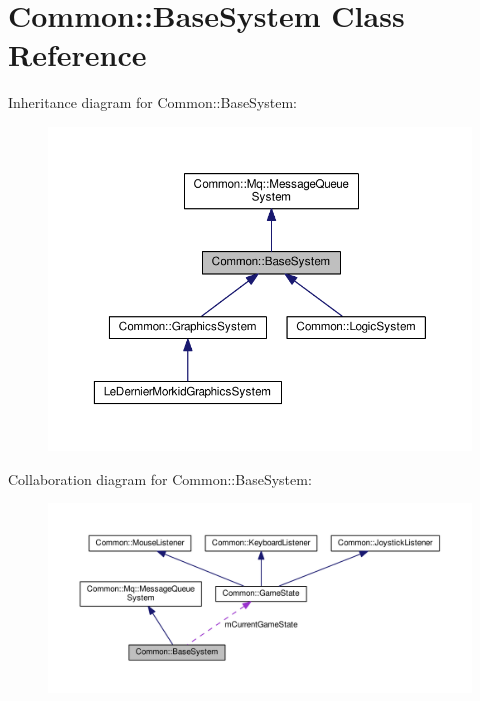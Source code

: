 \hypertarget{class_common_1_1_base_system}{}\section{Common\+:\+:Base\+System Class Reference}
\label{class_common_1_1_base_system}


Inheritance diagram for Common\+:\+:Base\+System\+:\nopagebreak
\begin{figure}[H]
\begin{center}
\leavevmode
\includegraphics[width=350pt]{class_common_1_1_base_system__inherit__graph}
\end{center}
\end{figure}


Collaboration diagram for Common\+:\+:Base\+System\+:\nopagebreak
\begin{figure}[H]
\begin{center}
\leavevmode
\includegraphics[width=350pt]{class_common_1_1_base_system__coll__graph}
\end{center}
\end{figure}
